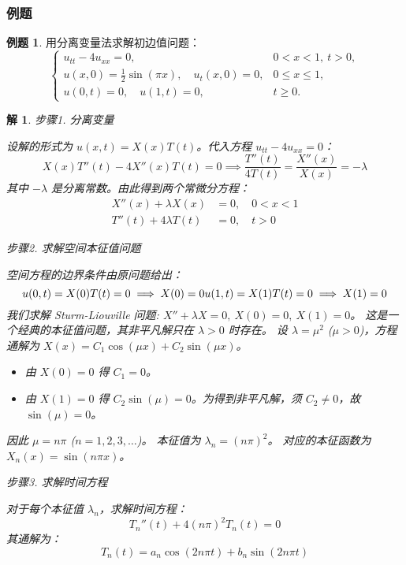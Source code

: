 \documentclass[a4paper, 12pt, oneside]{article} %
\numberwithin{subsection}{section}
\numberwithin{subsubsection}{subsection}
\theoremstyle{plain}
\newtheorem{solution}{解}[subsection]
\theoremstyle{definition}
\newtheorem{example}{例题}[subsection]
\theoremstyle{remark}
\begin{document}
			\subsubsection{例题}
		\begin{example}
			用分离变量法求解初边值问题：
			\[
			\begin{cases}
				u_{tt} - 4u_{xx} = 0, & 0 < x < 1, \ t > 0, \\
				u(x, 0) = \frac{1}{2}\sin(\pi x), \quad u_t(x, 0) = 0, & 0 \leq x \leq 1, \\
				u(0, t) = 0, \quad u(1, t) = 0, & t \geq 0.
			\end{cases}
			\]
		\end{example}
		\begin{solution}
			步骤1. 分离变量
			
			\noindent
			设解的形式为 $u(x,t) = X(x)T(t)$。代入方程 $u_{tt} - 4u_{xx} = 0$：
			\[
			X(x)T''(t) - 4X''(x)T(t) = 0 \implies \frac{T''(t)}{4T(t)} = \frac{X''(x)}{X(x)} = -\lambda
			\]
			其中 $-\lambda$ 是分离常数。由此得到两个常微分方程：
			\begin{align*}
				X''(x) + \lambda X(x) &= 0, \quad 0 < x < 1 \\
				T''(t) + 4\lambda T(t) &= 0, \quad t > 0
			\end{align*}
			
			
			步骤2. 求解空间本征值问题
			
			\noindent
			空间方程的边界条件由原问题给出：
			\[
			u(0,t) = X(0)T(t) = 0 \implies X(0)=0 \\
			u(1,t) = X(1)T(t) = 0 \implies X(1)=0
			\]
			我们求解 Sturm-Liouville 问题: $X'' + \lambda X = 0, \ X(0)=0, \ X(1)=0$。
			这是一个经典的本征值问题，其非平凡解只在 $\lambda > 0$ 时存在。
			设 $\lambda = \mu^2$ ($\mu>0$)，方程通解为 $X(x) = C_1 \cos(\mu x) + C_2 \sin(\mu x)$。
			\begin{itemize}
				\item 由 $X(0)=0$ 得 $C_1 = 0$。
				\item 由 $X(1)=0$ 得 $C_2 \sin(\mu) = 0$。为得到非平凡解，须 $C_2 \neq 0$，故 $\sin(\mu)=0$。
			\end{itemize}
			因此 $\mu = n\pi$ ($n=1, 2, 3, \dots$)。
			本征值为 $\lambda_n = (n\pi)^2$。
			对应的本征函数为 $X_n(x) = \sin(n\pi x)$。
			
			
			
			步骤3. 求解时间方程
			
			\noindent
			对于每个本征值 $\lambda_n$，求解时间方程：
			\[
			T_n''(t) + 4(n\pi)^2 T_n(t) = 0
			\]
			其通解为：
			\[
			T_n(t) = a_n \cos(2n\pi t) + b_n \sin(2n\pi t)
			\]
			

\end{solution}
\end{document}
